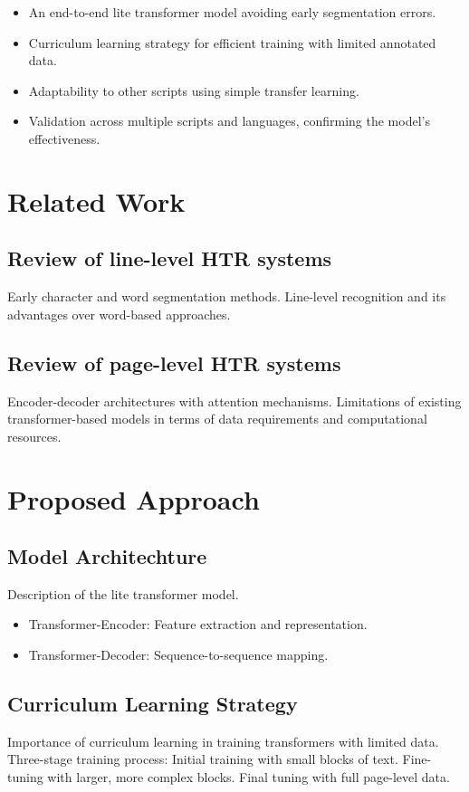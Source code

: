 \documentclass{article}
\begin{document}
    \begin{itemize}        
        \item An end-to-end lite transformer model avoiding early segmentation errors.
        \item Curriculum learning strategy for efficient training with limited annotated data.
        \item Adaptability to other scripts using simple transfer learning.
        \item Validation across multiple scripts and languages, confirming the model's effectiveness.
    \end{itemize}
    
\section{Related Work}
\subsection{Review of line-level HTR systems}
Early character and word segmentation methods.
Line-level recognition and its advantages over word-based approaches.

\subsection{Review of page-level HTR systems}
Encoder-decoder architectures with attention mechanisms.
Limitations of existing transformer-based models in terms of data requirements and computational resources.



\section{Proposed Approach}
\subsection{Model Architechture}
Description of the lite transformer model.
    \begin{itemize}
        \item Transformer-Encoder: Feature extraction and representation.
        \item Transformer-Decoder: Sequence-to-sequence mapping. 
    \end{itemize}
    
\subsection{Curriculum Learning Strategy}
Importance of curriculum learning in training transformers with limited data.
Three-stage training process:
Initial training with small blocks of text.
Fine-tuning with larger, more complex blocks.
Final tuning with full page-level data.
\end{document}
